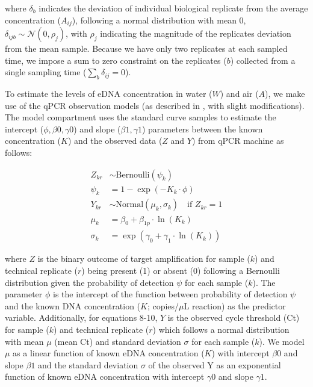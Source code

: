 \documentclass{article}
\begin{document}

where $\delta_b$ indicates the deviation of individual biological replicate from the average concentration ($A_{ij}$), following a normal distribution with mean 0, $\delta_{ijb} \sim \mathcal{N}(0,\rho_j)$, with $\rho_j$ indicating the magnitude of the replicates deviation from the mean sample. Because we have only two replicates at each sampled time, we impose a sum to zero constraint on the replicates ($b$) collected from a single sampling time ($\sum_b \delta_{ij} = 0$).

To estimate the levels of eDNA concentration in water ($W$) and air ($A$), we make use of the qPCR observation models (as described in \cite{guri2024, shelton2022}, with slight modifications). The model compartment uses the standard curve samples to estimate the intercept ($\phi,\beta0,\gamma0$) and slope ($\beta1, \gamma1$) parameters between the known concentration ($K$) and the observed data ($Z$ and $Y$) from qPCR machine as follows:

\begin{align}
    Z_{kr} &\sim \mathrm{Bernoulli} \left(\psi_{k}\right)  \\
    \psi_{k} &= 1 - \exp(-K_{k} \cdot \phi) \\
    Y_{kr} &\sim \mathrm{Normal} (\mu_{k}, \sigma_{k}) \quad \text{if } Z_{kr} = 1 \\
    \mu_{k} &= \beta_0 + \beta_{1p} \cdot \ln (K_{k}) \\
    \sigma_{k} &= \exp(\gamma_0 + \gamma_1 \cdot \ln (K_{k}))
\end{align}

where $Z$ is the binary outcome of target amplification for sample ($k$) and technical replicate ($r$) being present (1) or absent (0) following a Bernoulli distribution given the probability of detection $\psi$ for each sample ($k$). The parameter $\phi$ is the intercept of the function between probability of detection $\psi$ and the known DNA concentration ($K$; copies/$\mu$L reaction) as the predictor variable. Additionally, for equations 8-10, $Y$ is the observed cycle threshold (Ct) for sample ($k$) and technical replicate ($r$) which follows a normal distribution with mean $\mu$ (mean Ct) and standard deviation $\sigma$ for each sample ($k$). We model $\mu$ as a linear function of known eDNA concentration ($K$) with intercept $\beta0$ and slope $\beta1$ and the standard deviation $\sigma$ of the observed Y as an exponential function of known eDNA concentration with intercept $\gamma0$ and slope $\gamma1$.
\end{document}
